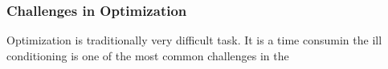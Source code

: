 \subsubsection{Challenges in Optimization}

Optimization is traditionally very difficult task. It is a time consumin
the ill conditioning is one of the most common challenges in the 
